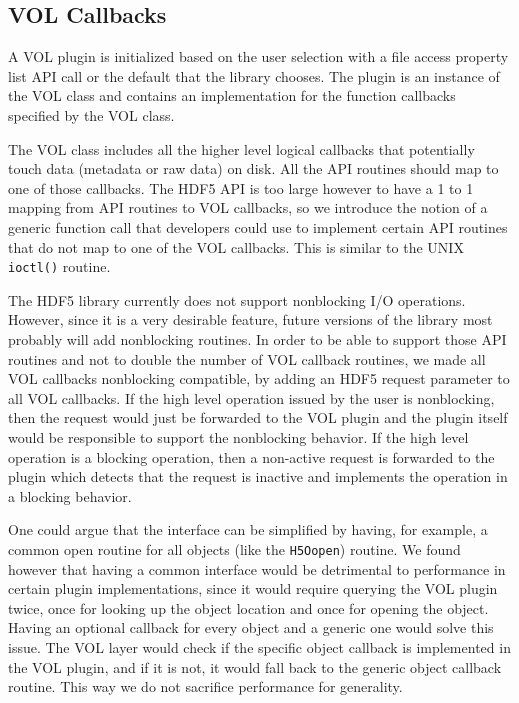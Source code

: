 \documentclass[letterpaper,hyper]{THG_RFC}
\begin{document}
\subsection{VOL Callbacks}
A VOL plugin is initialized based on the user selection with a file access property list API call or the default that the library chooses. The plugin is an instance of the VOL class and contains an implementation for the function callbacks specified by the VOL class. 

The VOL class includes all the higher level logical callbacks that potentially touch data (metadata or raw data) on disk. All the API routines should map to one of those callbacks. The HDF5 API is too large however to have a 1 to 1 mapping from API routines to VOL callbacks, so we introduce the notion of a generic function call that developers could use to implement certain API routines that do not map to one of the VOL callbacks. This is similar to the UNIX {\tt ioctl()} routine.

The HDF5 library currently does not support nonblocking I/O operations. However, since it is a very desirable feature, future versions of the library most probably will add nonblocking routines. In order to be able to support those API routines and not to double the number of VOL callback routines, we made all VOL callbacks nonblocking compatible, by adding an HDF5 request parameter to all VOL callbacks. If the high level operation issued by the user is nonblocking, then the request would just be forwarded to the VOL plugin and the plugin itself would be responsible to support the nonblocking behavior. If the high level operation is a blocking operation, then a non-active request is forwarded to the plugin which detects that the request is inactive and implements the operation in a blocking behavior. 

One could argue that the interface can be simplified by having, for example, a common open routine for all objects (like the {\tt H5Oopen}) routine. We found however that having  a common interface would be detrimental to performance in certain plugin implementations, since it would require querying the VOL plugin twice, once for looking up the object location and once for opening the object. Having an optional callback for every object and a generic one would solve this issue. The VOL layer would check if the specific object callback is implemented in the VOL plugin, and if it is not, it would fall back to the generic object callback routine. This way we do not sacrifice performance for generality.
\end{document}
